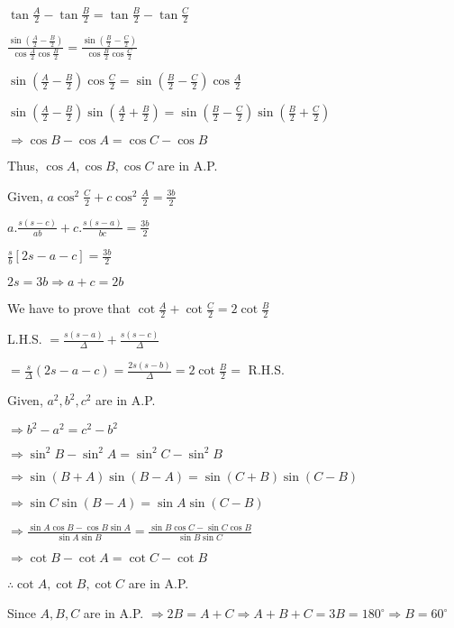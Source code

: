   $\tan\frac{A}{2} - \tan\frac{B}{2} = \tan\frac{B}{2} - \tan \frac{C}{2}$

  $\frac{\sin\left(\frac{A}{2} - \frac{B}{2}\right)}{\cos\frac{A}{2}\cos\frac{B}{2}} = \frac{\sin\left(\frac{B}{2} -
  \frac{C}{2}\right)}{\cos\frac{B}{2}\cos\frac{C}{2}}$

  $\sin\left(\frac{A}{2} - \frac{B}{2}\right)\cos\frac{C}{2} = \sin\left(\frac{B}{2} - \frac{C}{2}\right)\cos\frac{A}{2}$

  $\sin\left(\frac{A}{2} - \frac{B}{2}\right)\sin\left(\frac{A}{2} + \frac{B}{2}\right) = \sin\left(\frac{B}{2} -
  \frac{C}{2}\right)\sin\left(\frac{B}{2} + \frac{C}{2}\right)$

  $\Rightarrow \cos B - \cos A = \cos C - \cos B$

  Thus, $\cos A, \cos B, \cos C$ are in A.P.

\item Given, $a\cos^2\frac{C}{2} + c\cos^2\frac{A}{2} = \frac{3b}{2}$

  $a.\frac{s(s - c)}{ab} + c.\frac{s(s - a)}{bc} = \frac{3b}{2}$

  $\frac{s}{b}[2s - a - c] = \frac{3b}{2}$

  $2s = 3b \Rightarrow a + c = 2b$

  We have to prove that $\cot\frac{A}{2} + \cot\frac{C}{2} = 2\cot\frac{B}{2}$

  L.H.S. $= \frac{s(s - a)}{\Delta} + \frac{s(s - c)}{\Delta}$

  $= \frac{s}{\Delta}(2s - a - c) = \frac{2s(s - b)}{\Delta} = 2\cot\frac{B}{2} =$ R.H.S.

\item Given, $a^2, b^2, c^2$ are in A.P.

  $\Rightarrow b^2 - a^2 = c^2 - b^2$

  $\Rightarrow \sin^2B - \sin^2A = \sin^2C - \sin^2B$

  $\Rightarrow \sin(B + A)\sin(B - A) = \sin(C + B)\sin(C - B)$

  $\Rightarrow \sin C\sin(B - A) = \sin A\sin(C - B)$

  $\Rightarrow \frac{\sin A\cos B - \cos B\sin A}{\sin A\sin B} = \frac{\sin B\cos C - \sin C\cos B}{\sin B\sin C}$

  $\Rightarrow \cot B - \cot A = \cot C - \cot B$

  $\therefore \cot A, \cot B, \cot C$ are in A.P.

\item Since $A, B, C$ are in A.P. $\Rightarrow 2B = A + C \Rightarrow A + B + C = 3B = 180^\circ \Rightarrow B = 60^\circ$

